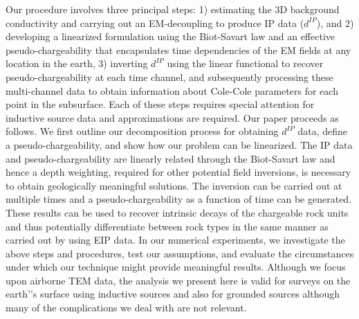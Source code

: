 \documentclass[extra,mreferee]{gji}
\newcommand{\dip}{d^{IP}}
\begin{document}
Our procedure involves three principal steps: 1) estimating the 3D background conductivity and carrying out an EM-decoupling to produce IP data ($\dip$), and 2) developing a linearized formulation using the Biot-Savart law and an effective pseudo-chargeability that encapsulates time dependencies of the EM fields at any location in the earth, 3) inverting $\dip$ using the linear functional to recover pseudo-chargeability at each time channel, and subsequently processing these multi-channel data to obtain information about Cole-Cole parameters for each point in the subsurface. Each of these steps requires special attention for inductive source data and approximations are required.
Our paper proceeds as follows. We first outline our decomposition process for obtaining $\dip$ data, define a pseudo-chargeability, and show how our problem can be linearized.
The IP data and  pseudo-chargeability are linearly related through the Biot-Savart law and hence a depth weighting, required for other potential field inversions, is necessary to obtain geologically meaningful solutions. The inversion can be carried out at multiple times and a pseudo-chargeability as a function of time can be generated. These results can be used to recover intrinsic decays of the chargeable rock units and thus potentially differentiate between rock types in the same manner as carried out by \cite{Yuval1997} using EIP data. In our numerical experiments, we investigate the above steps and procedures, test our assumptions, and evaluate the circumstances under which our technique might provide meaningful results. Although  we focus upon airborne TEM data, the analysis we present here is valid for surveys on the earth’'s surface using inductive sources and also for grounded sources although many of the complications we deal with are not relevant.

\end{document}
